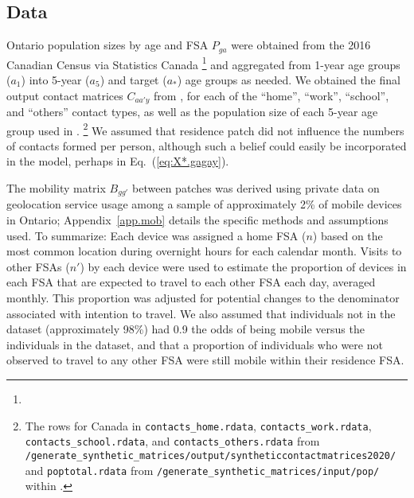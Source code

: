 \subsection{Data}\label{ex:data}
Ontario population sizes by age and FSA $P_{ga}$ were obtained from
the 2016 Canadian Census via Statistics Canada%
\footnote{}
and aggregated from 1-year age groups ($a_1$) into 5-year ($a_5$) and target ($a_*$) age groups as needed.
We obtained the final output contact matrices $C_{aa'y}$ from \cite{Prem2017},
for each of the ``home'', ``work'', ``school'', and ``others'' contact types,
as well as the population size of each 5-year age group used in \cite{Prem2017}.%
\footnote{\raggedright
  The rows for Canada in
  \texttt{contacts\_home.rdata},
  \texttt{contacts\_work.rdata},
  \texttt{contacts\_school.rdata}, and
  \texttt{contacts\_others.rdata}
  from \texttt{/generate\_synthetic\_matrices/output/syntheticcontactmatrices2020/} and
  \texttt{poptotal.rdata}
  from \texttt{/generate\_synthetic\_matrices/input/pop/}
  within .}
We assumed that residence patch did not influence the numbers of contacts formed per person,
although such a belief could easily be incorporated in the model,
perhaps in Eq.~(\ref{eq:X*.gagay}).
\par
The mobility matrix $B_{gg'}$ between patches was derived using
private data on geolocation service usage among a sample of approximately 2\% of mobile devices in Ontario;
Appendix~\ref{app.mob} details the specific methods and assumptions used.
To summarize:
Each device was assigned a home FSA ($n$) based on
the most common location during overnight hours for each calendar month.
Visits to other FSAs ($n'$) by each device were used to estimate
the proportion of devices in each FSA that are expected to travel to each other FSA each day, averaged monthly.
This proportion was adjusted for potential changes to the denominator associated with intention to travel.
We also assumed that individuals not in the dataset (approximately 98\%) had
0.9 the odds of being mobile versus the individuals in the dataset,
and that a proportion of individuals who were not observed to travel to any other FSA
were still mobile within their residence FSA.
